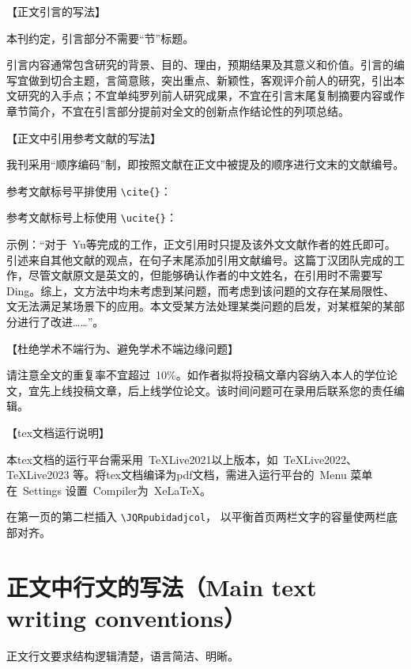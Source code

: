 \documentclass{JQRnew}
\begin{document}
\maketitle



【正文引言的写法】

本刊约定，引言部分不需要“节”标题。

引言内容通常包含研究的背景、目的、理由，预期结果及其意义和价值。引言的编写宜做到切合主题，言简意赅，突出重点、新颖性，客观评介前人的研究，引出本文研究的入手点；不宜单纯罗列前人研究成果，不宜在引言末尾复制摘要内容或作章节简介，不宜在引言部分提前对全文的创新点作结论性的列项总结。

【正文中引用参考文献的写法】

我刊采用“顺序编码”制，即按照文献在正文中被提及的顺序进行文末的文献编号。

参考文献标号平排使用 \verb|\cite{}|：

参考文献标号上标使用 \verb|\ucite{}|：

示例：“对于~Yu等完成的工作，正文引用时只提及该外文文献作者的姓氏即可。引述来自其他文献的观点，在句子末尾添加引用文献编号。这篇丁汉团队完成的工作，尽管文献原文是英文的，但能够确认作者的中文姓名，在引用时不需要写Ding。综上，文\cite{refd,refe,reff,refg}方法中均未考虑到某问题，而考虑到该问题的文\cite{refh}存在某局限性、文\cite{refi,refj}无法满足某场景下的应用。本文受某方法处理某类问题的启发，对某框架的某部分进行了改进……”。

【杜绝学术不端行为、避免学术不端边缘问题】

请注意全文的重复率不宜超过~10\%。如作者拟将投稿文章内容纳入本人的学位论文，宜先上线投稿文章，后上线学位论文。该时间问题可在录用后联系您的责任编辑。

【tex文档运行说明】
\JQRpubidadjcol

本tex文档的运行平台需采用~TeXLive2021以上版本，如~TeXLive2022、TeXLive2023 等。将tex文档编译为pdf文档，需进入运行平台的~Menu 菜单在~Settings 设置~Compiler为~XeLaTeX。

在第一页的第二栏插入 \verb|\JQRpubidadjcol|， 以平衡首页两栏文字的容量使两栏底部对齐。


\section{正文中行文的写法（Main text writing conventions）}


正文行文要求结构逻辑清楚，语言简洁、明晰。
\end{document}
